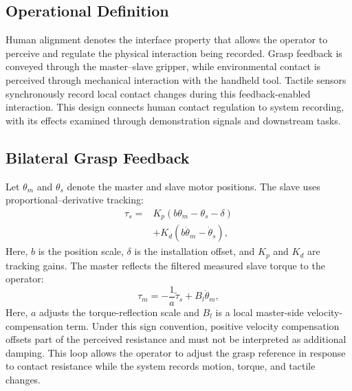 \subsection{Operational Definition}

Human alignment denotes the interface property that allows the operator to perceive and regulate the physical interaction being recorded.
Grasp feedback is conveyed through the master--slave gripper, while environmental contact is perceived through mechanical interaction with the handheld tool.
Tactile sensors synchronously record local contact changes during this feedback-enabled interaction.
This design connects human contact regulation to system recording, with its effects examined through demonstration signals and downstream tasks.

\subsection{Bilateral Grasp Feedback}

Let $\theta_m$ and $\theta_s$ denote the master and slave motor positions. The slave uses proportional--derivative tracking:
\begin{equation}
\begin{aligned}
    \tau_s ={}& K_p\left(b\theta_m-\theta_s-\delta\right)\\
              &+K_d\left(b\dot{\theta}_m-\dot{\theta}_s\right),
    \label{eq:slave_tracking}
\end{aligned}
\end{equation}
Here, $b$ is the position scale, $\delta$ is the installation offset, and $K_p$ and $K_d$ are tracking gains.
The master reflects the filtered measured slave torque to the operator:
\begin{equation}
    \tau_m=-\frac{1}{a}\widetilde{\tau}_s
           +B_l\dot{\theta}_m,
    \label{eq:master_feedback}
\end{equation}
Here, $a$ adjusts the torque-reflection scale and $B_l$ is a local master-side velocity-compensation term.
Under this sign convention, positive velocity compensation offsets part of the perceived resistance and must not be interpreted as additional damping.
This loop allows the operator to adjust the grasp reference in response to contact resistance while the system records motion, torque, and tactile changes.

